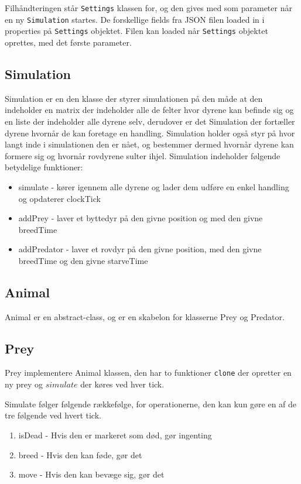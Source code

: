 \documentclass[a4paper]{article}
\begin{document}
      Filhåndteringen står \texttt{Settings} klassen for, og den gives med som parameter når en ny \texttt{Simulation} startes.
      De forskellige fields fra JSON filen loaded in i properties på \texttt{Settings} objektet.
      Filen kan loaded når \texttt{Settings} objektet oprettes, med det første parameter.
    
    \subsection*{Simulation}
    Simulation er en den klasse der styrer simulationen på den måde at den indeholder en matrix der indeholder
    alle de felter hvor dyrene kan befinde sig og en liste der indeholder alle dyrene selv, derudover er det
    Simulation der fortæller dyrene hvornår de kan foretage en handling. Simulation holder også styr på hvor
    langt inde i simulationen den er nået, og bestemmer dermed hvornår dyrene kan formere sig og hvornår
    rovdyrene sulter ihjel. Simulation indeholder følgende betydelige funktioner:

    \begin{itemize}
      \item simulate - kører igennem alle dyrene og lader dem udføre en enkel handling og opdaterer clockTick
      \item addPrey - laver et byttedyr på den givne position og med den givne breedTime
      \item addPredator - laver et rovdyr på den givne position, med den givne breedTime og den givne starveTime
    \end{itemize}
    
    \subsection*{Animal}
      Animal er en abstract-class, og er en skabelon for klasserne Prey og 
      Predator. 
    
    \subsection*{Prey}
      Prey implementere Animal klassen,
      den har to funktioner \lstinline$clone$ der opretter en ny prey
      og $simulate$ der køres ved hver tick.

      Simulate følger følgende rækkefølge, for operationerne,
      den kan kun gøre en af de tre følgende ved hvert tick.

      \begin{enumerate}
        \item isDead - Hvis den er markeret som død, gør ingenting
        \item breed - Hvis den kan føde, gør det
        \item move - Hvis den kan bevæge sig, gør det
      \end{enumerate}
\end{document}
